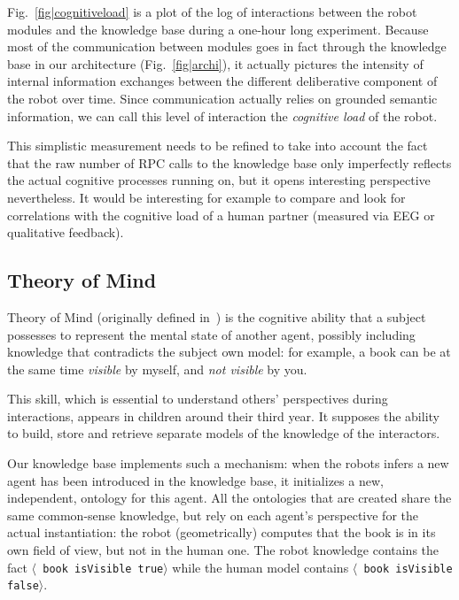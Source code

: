 \documentclass[letterpaper, 10 pt, conference]{ieeeconf}  %
\newcommand{\stmt}[1]{{\footnotesize \tt $\langle$ #1\relax$\rangle$}}
\begin{document}
Fig.~\ref{fig|cognitiveload} is a plot of the log of interactions between the
robot modules and the knowledge base during a one-hour long experiment. Because
most of the communication between modules goes in fact through the knowledge
base in our architecture (Fig.~\ref{fig|archi}), it actually pictures the
intensity of internal information exchanges between the different deliberative
component of the robot over time. Since communication actually relies on
grounded semantic information, we can call this level of interaction the
\emph{cognitive load} of the robot.

This simplistic measurement needs to be refined to take into account the fact
that the raw number of RPC calls to the knowledge base only imperfectly
reflects the actual cognitive processes running on, but it opens interesting
perspective nevertheless. It would be interesting for example to compare
and look for correlations with the cognitive load of a human partner (measured
via EEG or qualitative feedback).

\subsection{Theory of Mind}
\label{sect|tom}

Theory of Mind (originally defined in~\cite{Premack1978}) is the cognitive
ability that a subject possesses to represent the mental state of another
agent, possibly including knowledge that contradicts the subject own model: for
example, a book can be at the same time \emph{visible} by myself, and \emph{not
visible} by you.

This skill, which is essential to understand others' perspectives during
interactions, appears in children around their third year. It supposes the ability to build, store and retrieve separate models of the knowledge of the interactors.

Our knowledge base implements such a mechanism: when the robots infers a new
agent has been introduced in the knowledge base, it initializes a new,
independent, ontology for this agent. All the ontologies that are created share
the same common-sense knowledge, but rely on each agent's perspective for the
actual instantiation: the robot (geometrically) computes that the book is in
its own field of view, but not in the human one. The robot knowledge contains
the fact \stmt{book isVisible true} while the human model contains \stmt{book
isVisible false}.
\end{document}
